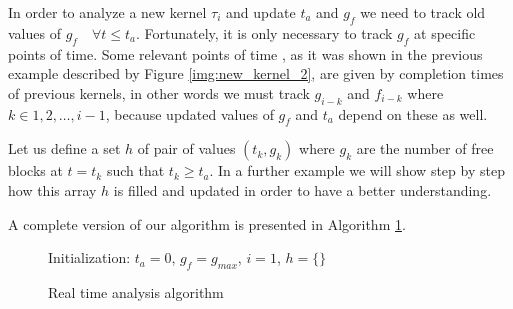 \documentclass[
  12pt,
  a4paperpaper,
]{report}
\begin{document}
In order to analyze a new kernel \(\tau_i\) and update \(t_a\) and
\(g_f\) we need to track old values of \(g_f\quad \forall t \leq t_a\).
Fortunately, it is only necessary to track \(g_f\) at specific points of
time. Some relevant points of time , as it was shown in the previous
example described by Figure \ref{img:new_kernel_2}, are given by
completion times of previous kernels, in other words we must track
\(g_{i-k}\) and \(f_{i-k}\) where \(k \in {1,2,\dots, i-1}\), because
updated values of \(g_f\) and \(t_a\) depend on these as well.

Let us define a set \(h\) of pair of values \((t_k, g_k)\) where \(g_k\)
are the number of free blocks at \(t=t_k\) such that \(t_k \geq t_a\).
In a further example we will show step by step how this array \(h\) is
filled and updated in order to have a better understanding.

A complete version of our algorithm is presented in Algorithm
\ref{alg:full}.

\begin{figure}[ht]
\centering
\begin{minipage}{.7\linewidth}
    \begin{algorithm}[H]
        \DontPrintSemicolon
        \SetAlgoLined
        \Input{$\tau$}
        \BlankLine
        Initialization: $t_a = 0$, $g_f = g_{max}$, $i=1$, $h = \{\}$ \\
        \caption{Real time analysis algorithm }
        \label{alg:full}
    \end{algorithm} 
  \end{minipage}
\end{figure}
\end{document}
